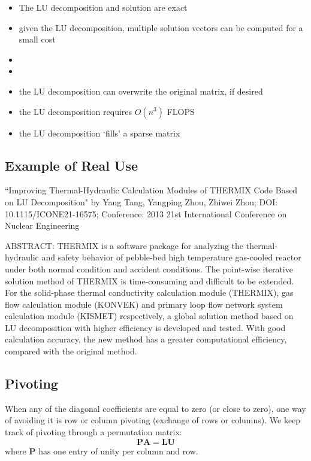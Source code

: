\documentclass[12pt, answers]{exam}
\newcommand{\ve}[1]{\ensuremath{\mathbf{#1}}}
\begin{document}
\begin{itemize}
\ifprintanswers
\item The LU decomposition and solution are exact
\item given the LU decomposition, multiple solution vectors can be computed for a small cost
\else
\item 
\item 
\fi
\item the LU decomposition can overwrite the original matrix, if desired
\item the LU decomposition requires $O(n^3)$ FLOPS
\item the LU decomposition `fills' a sparse matrix
\end{itemize}	

\subsection*{Example of Real Use}
``Improving Thermal-Hydraulic Calculation Modules of THERMIX Code Based on LU Decomposition"
by Yang Tang, Yangping Zhou, Zhiwei Zhou;
DOI: 10.1115/ICONE21-16575; Conference: 2013 21st International Conference on Nuclear Engineering

ABSTRACT: THERMIX is a software package for analyzing the thermal-hydraulic and safety behavior of pebble-bed high temperature gas-cooled reactor under both normal condition and accident conditions. The point-wise iterative solution method of THERMIX is time-consuming and difficult to be extended. For the solid-phase thermal conductivity calculation module (THERMIX), gas flow calculation module (KONVEK) and primary loop flow network system calculation module (KISMET) respectively, a global solution method based on LU decomposition with higher efficiency is developed and tested. With good calculation accuracy, the new method has a greater computational efficiency, compared with the original method.

\subsection*{Pivoting}
When any of the diagonal coefficients are equal to zero (or close to zero), one way of avoiding it is row or column pivoting (exchange of rows or columns). We keep track of pivoting through a permutation matrix:
\ifprintanswers
\[\ve{P}\ve{A} = \ve{L}\ve{U}\]
where $\ve{P}$ has one entry of unity per column and row.
\else
\\\vspace*{3em}
\fi
\end{document}
